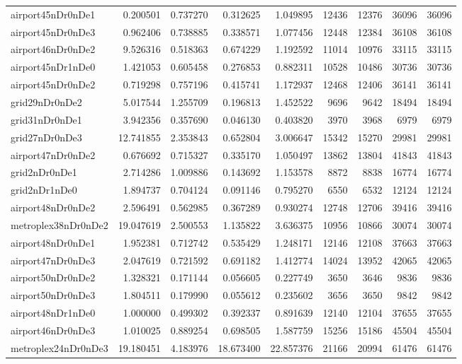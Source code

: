 \begin{longtable}{|l|r|r|r|r|r|r|r|r|}
airport45nDr0nDe1 & 0.200501 & 0.737270 & 0.312625 & 1.049895 & 12436 & 12376 & 36096 & 36096 \\
airport45nDr0nDe3 & 0.962406 & 0.738885 & 0.338571 & 1.077456 & 12448 & 12384 & 36108 & 36108 \\
airport46nDr0nDe2 & 9.526316 & 0.518363 & 0.674229 & 1.192592 & 11014 & 10976 & 33115 & 33115 \\
airport45nDr1nDe0 & 1.421053 & 0.605458 & 0.276853 & 0.882311 & 10528 & 10486 & 30736 & 30736 \\
airport45nDr0nDe2 & 0.719298 & 0.757196 & 0.415741 & 1.172937 & 12468 & 12406 & 36141 & 36141 \\
grid29nDr0nDe2 & 5.017544 & 1.255709 & 0.196813 & 1.452522 & 9696 & 9642 & 18494 & 18494 \\
grid31nDr0nDe1 & 3.942356 & 0.357690 & 0.046130 & 0.403820 & 3970 & 3968 & 6979 & 6979 \\
grid27nDr0nDe3 & 12.741855 & 2.353843 & 0.652804 & 3.006647 & 15342 & 15270 & 29981 & 29981 \\
airport47nDr0nDe2 & 0.676692 & 0.715327 & 0.335170 & 1.050497 & 13862 & 13804 & 41843 & 41843 \\
grid2nDr0nDe1 & 2.714286 & 1.009886 & 0.143692 & 1.153578 & 8872 & 8838 & 16774 & 16774 \\
grid2nDr1nDe0 & 1.894737 & 0.704124 & 0.091146 & 0.795270 & 6550 & 6532 & 12124 & 12124 \\
airport48nDr0nDe2 & 2.596491 & 0.562985 & 0.367289 & 0.930274 & 12748 & 12706 & 39416 & 39416 \\
metroplex38nDr0nDe2 & 19.047619 & 2.500553 & 1.135822 & 3.636375 & 10956 & 10866 & 30074 & 30074 \\
airport48nDr0nDe1 & 1.952381 & 0.712742 & 0.535429 & 1.248171 & 12146 & 12108 & 37663 & 37663 \\
airport47nDr0nDe3 & 2.047619 & 0.721592 & 0.691182 & 1.412774 & 14024 & 13952 & 42065 & 42065 \\
airport50nDr0nDe2 & 1.328321 & 0.171144 & 0.056605 & 0.227749 & 3650 & 3646 & 9836 & 9836 \\
airport50nDr0nDe3 & 1.804511 & 0.179990 & 0.055612 & 0.235602 & 3656 & 3650 & 9842 & 9842 \\
airport48nDr1nDe0 & 1.000000 & 0.499302 & 0.392337 & 0.891639 & 12140 & 12104 & 37655 & 37655 \\
airport46nDr0nDe3 & 1.010025 & 0.889254 & 0.698505 & 1.587759 & 15256 & 15186 & 45504 & 45504 \\
metroplex24nDr0nDe3 & 19.180451 & 4.183976 & 18.673400 & 22.857376 & 21166 & 20994 & 61476 & 61476 \\

\end{longtable}
